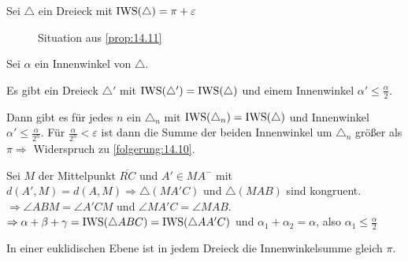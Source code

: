 \begin{beweis}
    Sei $\triangle$ ein Dreieck mit $\operatorname{IWS}(\triangle) = \pi + \varepsilon$

    \begin{figure}[ht]
        \centering
        \label{fig:prop14.11.0}
        \caption{Situation aus \cref{prop:14.11}}
    \end{figure}

    Sei $\alpha$ ein Innenwinkel von $\triangle$.

    \begin{behauptung}
        Es gibt ein Dreieck $\triangle'$ mit 
        $\operatorname{IWS}(\triangle') = \operatorname{IWS}(\triangle)$ und einem Innenwinkel
        $\alpha' \leq \frac{\alpha}{2}$.

        Dann gibt es für jedes $n$ ein $\triangle_n$ mit $\operatorname{IWS}(\triangle_n) = \operatorname{IWS}(\triangle)$
        und Innenwinkel $\alpha' \leq \frac{\alpha}{2^n}$. Für $\frac{\alpha}{2^n} < \varepsilon$
        ist dann die Summe der beiden Innenwinkel
        um $\triangle_n$ größer als $\pi \Rightarrow$ Widerspruch zu
        \cref{folgerung:14.10}.
    \end{behauptung}

    \begin{beweis}
        Sei $M$ der Mittelpunkt $\overline{RC}$ und $A' \in MA^-$ mit
        $d(A', M) = d(A, M) \Rightarrow \triangle(MA'C)$ und
        $\triangle(MAB)$ sind kongruent.
        $\Rightarrow \angle ABM = \angle A'CM$ und $\angle MA'C = \angle MAB$.
        $\Rightarrow \alpha + \beta + \gamma =\operatorname{IWS}(\triangle ABC) = \operatorname{IWS}(\triangle AA'C)$
        und $\alpha_1 + \alpha_2 = \alpha$, also \obda $\alpha_1 \leq \frac{\alpha}{2}$
    \end{beweis}
\end{beweis}
\begin{bemerkung}\label{bem:14.12}%
    In einer euklidischen Ebene ist in jedem Dreieck die Innenwinkelsumme
    gleich $\pi$.
\end{bemerkung}

